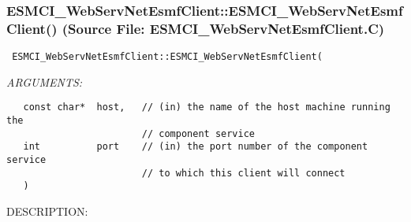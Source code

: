  
\setlength{\oldparskip}{\parskip}
\setlength{\parskip}{1.5ex}
\setlength{\oldparindent}{\parindent}
\setlength{\parindent}{0pt}
\setlength{\oldbaselineskip}{\baselineskip}
\setlength{\baselineskip}{11pt}
 
\def\bv{\begin{verbatim}}
\def\ev{\end{verbatim}}
\def\be{\begin{equation}}
\def\ee{\end{equation}}
\def\bea{\begin{eqnarray}}
\def\eea{\end{eqnarray}}
\def\bi{\begin{itemize}}
\def\ei{\end{itemize}}
\def\bn{\begin{enumerate}}
\def\en{\end{enumerate}}
\def\bd{\begin{description}}
\def\ed{\end{description}}
\def\({\left (}
\def\){\right )}
\def\[{\left [}
\def\]{\right ]}
\def\<{\left  \langle}
\def\>{\right \rangle}
\def\cI{{\cal I}}
\def\diag{\mathop{\rm diag}}
\def\tr{\mathop{\rm tr}}


 
\subsubsection{ESMCI\_WebServNetEsmfClient::ESMCI\_WebServNetEsmfClient() (Source File: ESMCI\_WebServNetEsmfClient.C)}


  
\begin{verbatim} ESMCI_WebServNetEsmfClient::ESMCI_WebServNetEsmfClient(\end{verbatim}{\em ARGUMENTS:}
\begin{verbatim}   const char*  host,   // (in) the name of the host machine running the
                        // component service
   int          port    // (in) the port number of the component service
                        // to which this client will connect
   )\end{verbatim}
{\sf DESCRIPTION:\\ }


